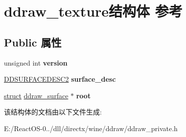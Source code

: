 \hypertarget{structddraw__texture}{}\section{ddraw\+\_\+texture结构体 参考}
\label{structddraw__texture}
\subsection*{Public 属性}
\begin{DoxyCompactItemize}
\item 
\mbox{\label{structddraw__texture_a0be3e5d0e3710138985a6a1b73469237}} 
unsigned int {\bfseries version}
\item 
\mbox{\label{structddraw__texture_ad460204d7ae70655a7c58c6e138303f6}} 
\hyperlink{struct___d_d_s_u_r_f_a_c_e_d_e_s_c2}{D\+D\+S\+U\+R\+F\+A\+C\+E\+D\+E\+S\+C2} {\bfseries surface\+\_\+desc}
\item 
\mbox{\label{structddraw__texture_a4437d32ad1f29901b7ed1287b7fa051c}} 
\hyperlink{interfacestruct}{struct} \hyperlink{structddraw__surface}{ddraw\+\_\+surface} $\ast$ {\bfseries root}
\end{DoxyCompactItemize}


该结构体的文档由以下文件生成\+:\begin{DoxyCompactItemize}
\item 
E\+:/\+React\+O\+S-\/0../dll/directx/wine/ddraw/ddraw\+\_\+private.\+h\end{DoxyCompactItemize}
